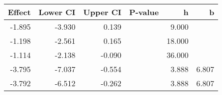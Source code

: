 \begin{table}[ht]
\centering
\begin{tabular}{rrrrrr}
  \hline
Effect & Lower CI & Upper CI & P-value & h & b \\ 
  \hline
-1.895 & -3.930 & 0.139 &  & 9.000 &  \\ 
  -1.198 & -2.561 & 0.165 &  & 18.000 &  \\ 
  -1.114 & -2.138 & -0.090 &  & 36.000 &  \\ 
  -3.795 & -7.037 & -0.554 &  & 3.888 & 6.807 \\ 
  -3.792 & -6.512 & -0.262 &  & 3.888 & 6.807 \\ 
   \hline
\end{tabular}
\end{table}

